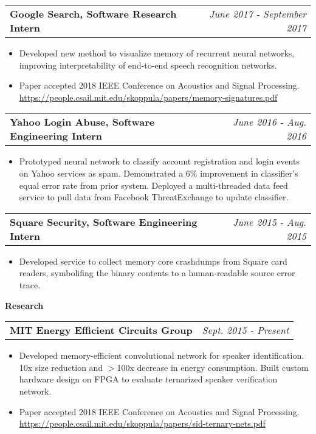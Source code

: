 \documentclass[letterpaper,11pt]{article}
\makeatletter
\newcommand{\resitem}[1]{\item[--] #1 \vspace{-4pt}}
\newcommand{\ressubheadingtwo}[2] {
\begin{tabular*}{7in}{l@{\extracolsep{\fill}}r}
	\textbf{#1} & \textit{#2} \\
\end{tabular*}\vspace{-6pt}}
\makeatother
\begin{document}
	\ressubheadingtwo{Google Search, Software Research Intern}{June 2017 - September 2017}
	\begin{itemize}
            \resitem{Developed new method to visualize memory of recurrent neural networks, improving interpretability of end-to-end speech recognition networks.}
            \resitem{Paper accepted 2018 IEEE Conference on Acoustics and Signal Processing. \url{https://people.csail.mit.edu/skoppula/papers/memory-signatures.pdf} }
	\end{itemize}

	\ressubheadingtwo{Yahoo Login Abuse, Software Engineering Intern}{June 2016 - Aug. 2016}
	\begin{itemize}
            \resitem{Prototyped neural network to classify account registration and login events on Yahoo services as spam. Demonstrated a 6\% improvement in classifier's equal error rate from prior system. Deployed a multi-threaded data feed service to pull data from Facebook ThreatExchange to update classifier.}
	\end{itemize}

    \vspace{0.05in}

    \vspace{0.05in}
	\ressubheadingtwo{Square Security, Software Engineering Intern}{June 2015 - Aug. 2015}
	\begin{itemize}
            \resitem{Developed service to collect memory core crashdumps from Square card readers, symbolifing the binary contents to a human-readable source error trace.}
	\end{itemize}

    \vspace{0.05in}

\large \textbf{Research \vspace{1mm}} \normalsize
    \vspace{0.05in}

	\ressubheadingtwo{MIT Energy Efficient Circuits Group}{Sept. 2015 - Present}{}
	\begin{itemize}
            \resitem{Developed memory-efficient convolutional network for speaker identification. 10x size reduction and $>$100x decrease in energy consumption. Built custom hardware design on FPGA to evaluate ternarized speaker verification network.}
            \resitem{Paper accepted 2018 IEEE Conference on Acoustics and Signal Processing. \url{https://people.csail.mit.edu/skoppula/papers/sid-ternary-nets.pdf} }
	\end{itemize}
\end{document}
